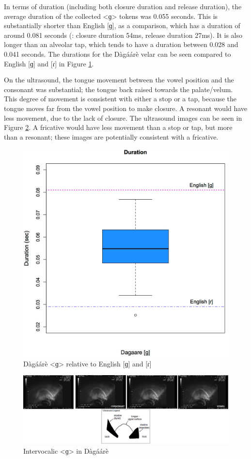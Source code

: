 \documentclass[output=paper, modfonts]{langscibook}
\begin{document}
In terms of duration (including both closure duration and release duration), the average duration of the collected <ɡ> tokens was 0.055 seconds. This is substantially shorter than English [ɡ], as a comparison, which has a duration of around 0.081 seconds (\citealt{byrd199354}: closure duration 54ms, release duration 27ms). It is also longer than an alveolar tap, which tends to have a duration between 0.028 and 0.041 seconds. The durations for the Dàgáárè velar can be seen compared to English [ɡ] and [ɾ] in Figure \ref{tab:2:duration}. 


On the ultrasound, the tongue movement between the vowel position and the consonant was substantial; the tongue back raised towards the palate/velum. This degree of movement is consistent with either a stop or a tap, because the tongue moves far from the vowel position to make closure. A resonant would have less movement, due to the lack of closure. The ultrasound images can be seen in Figure \ref{tab:3:ultrasound}. A fricative would have less movement than a stop or tap, but more than a resonant; these images are  potentially consistent with a fricative. 

\begin{figure}[p]
\includegraphics[width=.8\linewidth]{g_duration.jpg}
\caption{Dàgáárè <ɡ> relative to English [ɡ] and [ɾ]}
\label{tab:2:duration}
\end{figure}

\begin{figure}[p]
\includegraphics[width=1\linewidth]{ultrasound.jpg}
\caption{Intervocalic <ɡ> in Dàgáárè}
\label{tab:3:ultrasound}
\end{figure}
\end{document}
